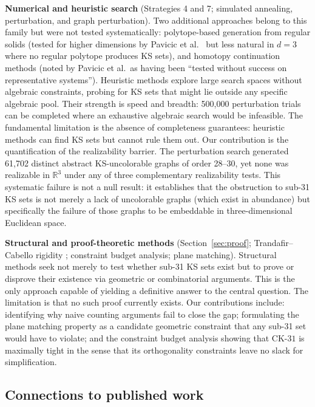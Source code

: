\documentclass[twocolumn,pra,superscriptaddress,nofootinbib]{revtex4-2}
\newcommand{\R}{\mathbb{R}}
\newcommand{\CK}{\mathrm{CK\text{-}31}}
\begin{document}
\textbf{Numerical and heuristic search} (Strategies 4 and 7; simulated
annealing, perturbation, and graph perturbation). Two additional approaches
belong to this family but were not tested systematically: polytope-based
generation from regular solids (tested for higher dimensions by
Pavicic et al.~\cite{Pavicic2004} but less natural in $d = 3$ where no
regular polytope produces KS sets), and homotopy continuation methods
(noted by Pavicic et al.\ as having been ``tested without success on
representative systems''). Heuristic methods explore
large search spaces without algebraic constraints, probing for KS sets that
might lie outside any specific algebraic pool. Their strength is speed and
breadth: 500,000 perturbation trials can be completed where an exhaustive
algebraic search would be infeasible. The fundamental limitation is the absence
of completeness guarantees: heuristic methods can find KS sets but cannot rule
them out. Our contribution is the quantification of the realizability barrier.
The perturbation search generated 61,702 distinct abstract KS-uncolorable
graphs of order 28--30, yet none was realizable in $\R^3$ under any of three
complementary realizability tests. This systematic failure is not a null result:
it establishes that the obstruction to sub-31 KS sets is not merely a lack of
uncolorable graphs (which exist in abundance) but specifically the failure of
those graphs to be embeddable in three-dimensional Euclidean space.

\textbf{Structural and proof-theoretic methods} (Section~\ref{sec:proof};
Trandafir--Cabello rigidity \cite{TrandafirCabello2025}; constraint budget
analysis; plane matching). Structural methods seek not merely to test whether
sub-31 KS sets exist but to prove or disprove their existence via geometric
or combinatorial arguments. This is the only approach capable of yielding a
definitive answer to the central question. The limitation is that no such proof
currently exists. Our contributions include: identifying why naive counting
arguments fail to close the gap; formulating the plane matching property as a
candidate geometric constraint that any sub-31 set would have to violate; and
the constraint budget analysis showing that $\CK$ is maximally tight in the
sense that its orthogonality constraints leave no slack for simplification.

\subsection{Connections to published work}
\end{document}
